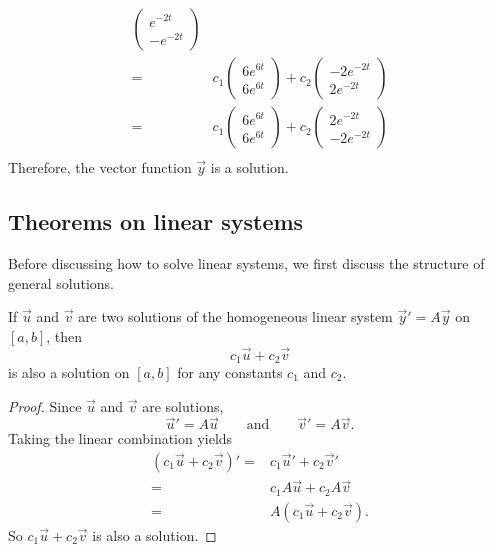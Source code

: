 \begin{solution}
\[\begin{aligned}
\begin{pmatrix}
          e^{-2t} \\
          -e^{-2t}
        \end{pmatrix}
      \\
      =&
        c_1
        \begin{pmatrix}
          6e^{6t} \\ 6e^{6t}
        \end{pmatrix}
        +c_2
        \begin{pmatrix}
          -2e^{-2t} \\
          2e^{-2t}
        \end{pmatrix}
      \\
      =&
        c_1
        \begin{pmatrix}
          6e^{6t} \\ 
          6e^{6t}
        \end{pmatrix} + 
        c_2
        \begin{pmatrix}
          2e^{-2t} \\
          -2e^{-2t}
        \end{pmatrix}
      \\
    \end{aligned}
  \] 
  Therefore, the vector function $\vec{y}$ is a solution.
\end{solution}

\subsection*{Theorems on linear systems}

Before discussing how to solve linear systems, we first discuss the structure of general solutions.

\begin{theorem}
  If $\vec{u}$ and $\vec{v}$ are two solutions of the homogeneous linear system $\vec{y}'=A\vec{y}$ on $[a, b]$, then
\[c_1\vec{u}+c_2\vec{v}\]
is also a solution on $[a, b]$ for any constants $c_1$ and $c_2$.
\end{theorem}
\begin{proof}
  Since $\vec{u}$ and $\vec{v}$ are solutions, 
  \[\vec{u}'=A\vec{u}\qquad\text{and}\qquad\vec{v}'=A\vec{v}.\]
  Taking the linear combination yields
  \[
    \begin{aligned}
      (c_1\vec{u}+c_2\vec{v})'
      =&c_1\vec{u}'+c_2\vec{v}'\\
      =&c_1A\vec{u}+c_2A\vec{v}\\
      =&A(c_1\vec{u}+c_2\vec{v}).  
    \end{aligned}
  \]
  So $c_1\vec{u}+c_2\vec{v}$ is also a solution.
\end{proof}

